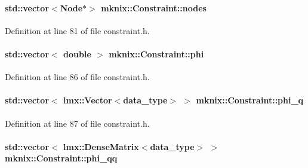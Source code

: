\paragraph[{nodes}]{\setlength{\rightskip}{0pt plus 5cm}std\+::vector$<${\bf Node}$\ast$$>$ mknix\+::\+Constraint\+::nodes\hspace{0.3cm}{\ttfamily [protected]}}\label{classmknix_1_1_constraint_aa4aa16e121963acf4c086f63137d4ac1}


Definition at line 81 of file constraint.\+h.

\hypertarget{classmknix_1_1_constraint_a10e027fc12cb248a49a1ded049f0a161}{}
\paragraph[{phi}]{\setlength{\rightskip}{0pt plus 5cm}std\+::vector$<$ double $>$ mknix\+::\+Constraint\+::phi\hspace{0.3cm}{\ttfamily [protected]}}\label{classmknix_1_1_constraint_a10e027fc12cb248a49a1ded049f0a161}


Definition at line 86 of file constraint.\+h.

\hypertarget{classmknix_1_1_constraint_a667ecb78177b06981c30e23cb194b806}{}
\paragraph[{phi\+\_\+q}]{\setlength{\rightskip}{0pt plus 5cm}std\+::vector$<$ {\bf lmx\+::\+Vector}$<${\bf data\+\_\+type}$>$ $>$ mknix\+::\+Constraint\+::phi\+\_\+q\hspace{0.3cm}{\ttfamily [protected]}}\label{classmknix_1_1_constraint_a667ecb78177b06981c30e23cb194b806}


Definition at line 87 of file constraint.\+h.

\hypertarget{classmknix_1_1_constraint_a9173b52da189652951ce51b1d69fcde4}{}
\paragraph[{phi\+\_\+qq}]{\setlength{\rightskip}{0pt plus 5cm}std\+::vector$<$ {\bf lmx\+::\+Dense\+Matrix}$<${\bf data\+\_\+type}$>$ $>$ mknix\+::\+Constraint\+::phi\+\_\+qq\hspace{0.3cm}{\ttfamily [protected]}}\label{classmknix_1_1_constraint_a9173b52da189652951ce51b1d69fcde4}


